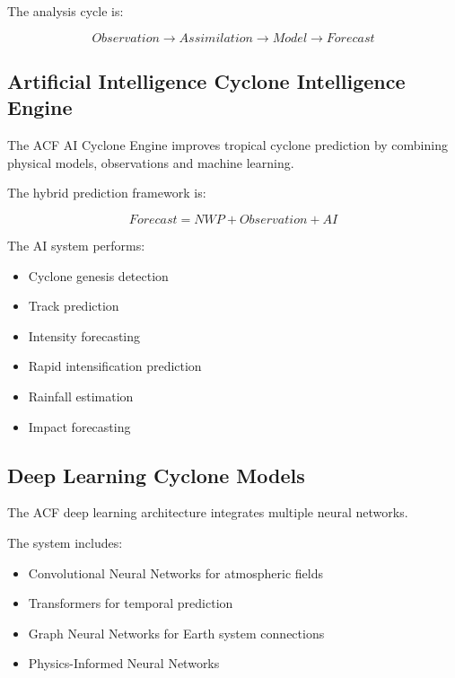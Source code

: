 The analysis cycle is:

\[
Observation
\rightarrow
Assimilation
\rightarrow
Model
\rightarrow
Forecast
\]


\subsection{Artificial Intelligence Cyclone Intelligence Engine}

The ACF AI Cyclone Engine improves tropical cyclone prediction by
combining physical models, observations and machine learning.

The hybrid prediction framework is:

\[
Forecast=
NWP
+
Observation
+
AI
\]


The AI system performs:

\begin{itemize}

\item Cyclone genesis detection

\item Track prediction

\item Intensity forecasting

\item Rapid intensification prediction

\item Rainfall estimation

\item Impact forecasting

\end{itemize}



\subsection{Deep Learning Cyclone Models}

The ACF deep learning architecture integrates multiple neural networks.

The system includes:

\begin{itemize}

\item Convolutional Neural Networks for atmospheric fields

\item Transformers for temporal prediction

\item Graph Neural Networks for Earth system connections

\item Physics-Informed Neural Networks

\end{itemize}


